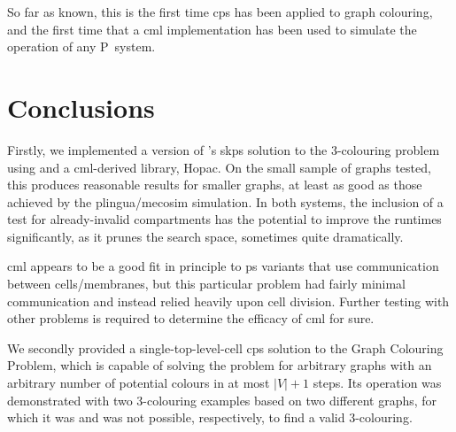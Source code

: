 So far as known, this is the first time \gls{cps} has been applied to graph colouring, and the first time that a \gls{cml} implementation has been used to simulate the operation of any P~system.





\section{\label{sec:gcol:conc}Conclusions}
Firstly, we implemented a version of \citeauthor{Gheorghe2013}'s \gls{skps} solution to the 3-colouring problem using \fsharp{} and a \gls{cml}-derived library, Hopac.   On the small sample of graphs tested, this produces reasonable results for smaller graphs, at least as good as those achieved by the \gls{plingua}/\gls{mecosim} simulation.  In both systems, the inclusion of a test for already-invalid compartments has the potential to improve the runtimes significantly, as it prunes the search space, sometimes quite dramatically.

\gls{cml} appears to be a good fit in principle to \gls{ps} variants that use communication between cells/membranes, but this particular problem had fairly minimal communication and instead relied heavily upon cell division.  Further testing with other problems is required to determine the efficacy of \gls{cml} for sure.

We secondly provided a single-top-level-cell \gls{cps} solution to the Graph Colouring Problem, which is capable of solving the problem for arbitrary graphs with an arbitrary number of potential colours in at most \(|V| + 1\) steps.  Its operation was demonstrated with two 3-colouring examples based on two different graphs, for which it was and was not possible, respectively, to find a valid 3-colouring.
